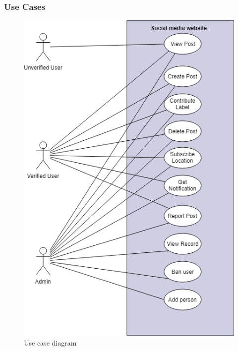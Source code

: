 \subsubsection{Use Cases}
\begin{center}
	\begin{figure}[H]
		\centering
		\includegraphics[width=0.75\columnwidth]{images/chap4/usecase.png}
		\caption{Use case diagram}
		\label{chap4:user_case_diagram}
	\end{figure}
\end{center}
